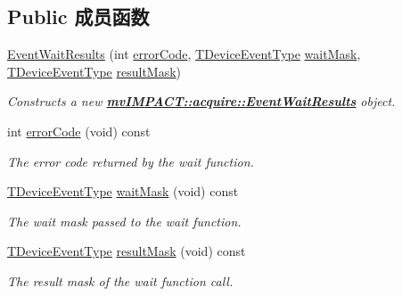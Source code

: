 \subsection*{Public 成员函数}
\begin{DoxyCompactItemize}
\item 
\hyperlink{group___device_specific_interface_ga6f53d7cf6f361a7a87d468be369c6a1e}{Event\+Wait\+Results} (int \hyperlink{classmv_i_m_p_a_c_t_1_1acquire_1_1_event_wait_results_a72954fbe6c75cc1ca7c6123c02358350}{error\+Code}, \hyperlink{group___common_interface_ga0947eb7d6a73b9baab283cbf65cd8d6b}{T\+Device\+Event\+Type} \hyperlink{classmv_i_m_p_a_c_t_1_1acquire_1_1_event_wait_results_a9a0ae92dc85c4daa39baeb7707446b69}{wait\+Mask}, \hyperlink{group___common_interface_ga0947eb7d6a73b9baab283cbf65cd8d6b}{T\+Device\+Event\+Type} \hyperlink{classmv_i_m_p_a_c_t_1_1acquire_1_1_event_wait_results_a26d8df5e9f77bcfed2dd550c993e5306}{result\+Mask})
\begin{DoxyCompactList}\small\item\em Constructs a new {\bfseries \hyperlink{classmv_i_m_p_a_c_t_1_1acquire_1_1_event_wait_results}{mv\+I\+M\+P\+A\+C\+T\+::acquire\+::\+Event\+Wait\+Results}} object. \end{DoxyCompactList}\item 
int \hyperlink{classmv_i_m_p_a_c_t_1_1acquire_1_1_event_wait_results_a72954fbe6c75cc1ca7c6123c02358350}{error\+Code} (void) const 
\begin{DoxyCompactList}\small\item\em The error code returned by the wait function. \end{DoxyCompactList}\item 
\hyperlink{group___common_interface_ga0947eb7d6a73b9baab283cbf65cd8d6b}{T\+Device\+Event\+Type} \hyperlink{classmv_i_m_p_a_c_t_1_1acquire_1_1_event_wait_results_a9a0ae92dc85c4daa39baeb7707446b69}{wait\+Mask} (void) const 
\begin{DoxyCompactList}\small\item\em The wait mask passed to the wait function. \end{DoxyCompactList}\item 
\hyperlink{group___common_interface_ga0947eb7d6a73b9baab283cbf65cd8d6b}{T\+Device\+Event\+Type} \hyperlink{classmv_i_m_p_a_c_t_1_1acquire_1_1_event_wait_results_a26d8df5e9f77bcfed2dd550c993e5306}{result\+Mask} (void) const 
\begin{DoxyCompactList}\small\item\em The result mask of the wait function call. \end{DoxyCompactList}\end{DoxyCompactItemize}


